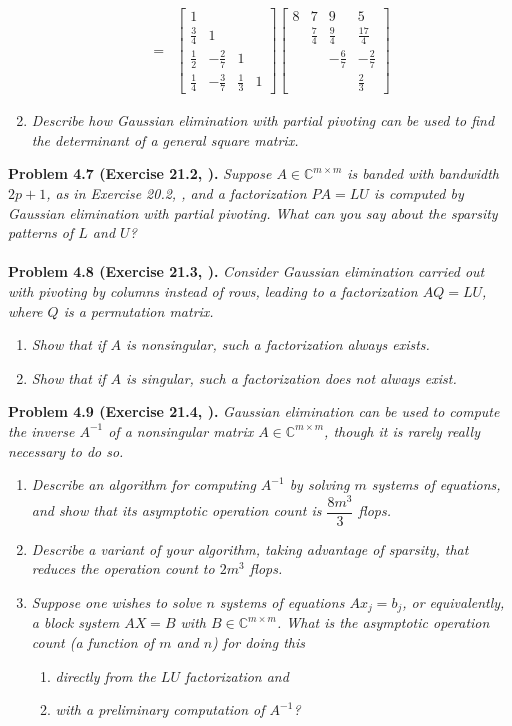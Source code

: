 \documentclass[a4paper,oneside]{book}
\numberwithin{equation}{chapter}
\begin{document}
\begin{enumerate}
\begin{align}
= &\left[ {\begin{array}{*{20}{c}}
1&{}&{}&{}\\
{\frac{3}{4}}&1&{}&{}\\
{\frac{1}{2}}&{ - \frac{2}{7}}&1&{}\\
{\frac{1}{4}}&{ - \frac{3}{7}}&{\frac{1}{3}}&1
\end{array}} \right]\left[ {\begin{array}{*{20}{c}}
8&7&9&5\\
{}&{\frac{7}{4}}&{\frac{9}{4}}&{\frac{{17}}{4}}\\
{}&{}&{ - \frac{6}{7}}&{ - \frac{2}{7}}\\
{}&{}&{}&{\frac{2}{3}}
\end{array}} \right]
\end{align}
\item \textit{Describe how Gaussian elimination with partial pivoting can be used to find the determinant of a general square matrix.}
\end{enumerate}
\textbf{Problem 4.7 (Exercise 21.2, \cite{1}).} \textit{Suppose $A\in \mathbb{C}^{m\times m}$ is banded with bandwidth $2p+1$, as in Exercise 20.2, \cite{1}, and a factorization $PA=LU$ is computed by Gaussian elimination with partial pivoting. What can you say about the sparsity patterns of $L$ and $U$?}\\
\\
\textbf{Problem 4.8 (Exercise 21.3, \cite{1}).} \textit{Consider Gaussian elimination carried out with pivoting by columns instead of rows, leading to a factorization $AQ=LU$, where $Q$ is a permutation matrix.}
\begin{enumerate}
\item \textit{Show that if $A$ is nonsingular, such a factorization always exists.}
\item \textit{Show that if $A$ is singular, such a factorization does not always exist.}
\end{enumerate}
\textbf{Problem 4.9 (Exercise 21.4, \cite{1}).} \textit{Gaussian elimination can be used to compute the inverse $A^{-1}$ of a nonsingular matrix $A\in \mathbb{C}^{m\times m}$, though it is rarely really necessary to do so.}
\begin{enumerate}
\item \textit{Describe an algorithm for computing $A^{-1}$ by solving $m$ systems of equations, and show that its asymptotic operation count is $\dfrac{8m^3}{3}$ flops.}
\item \textit{Describe a variant of your algorithm, taking advantage of sparsity, that reduces the operation count to $2m^3$ flops.}
\item \textit{Suppose one wishes to solve $n$ systems of equations $Ax_j=b_j$, or equivalently, a block system $AX=B$ with $B\in \mathbb{C}^{m\times m}$. What is the asymptotic operation count (a function of $m$ and $n$) for doing this}
\begin{enumerate}
\item \textit{directly from the $LU$ factorization and}
\item \textit{with a preliminary computation of $A^{-1}$?}
\end{enumerate}
\end{enumerate}
\end{document}
